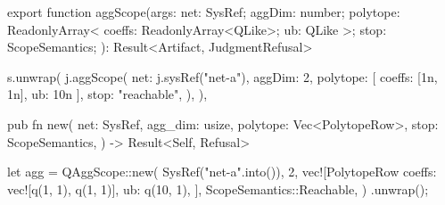 \begin{tssrc}
export function aggScope(args: {
  net: SysRef;
  aggDim: number;
  polytope: ReadonlyArray<{ coeffs: ReadonlyArray<QLike>; ub: QLike }>;
  stop: ScopeSemantics;
}): Result<Artifact, JudgmentRefusal>
\end{tssrc}
\begin{tssrc}
s.unwrap(
  j.aggScope({
    net: j.sysRef("net-a"),
    aggDim: 2,
    polytope: [{ coeffs: [1n, 1n], ub: 10n }],
    stop: "reachable",
  }),
),
\end{tssrc}
\begin{rustsrc}
pub fn new(
    net: SysRef,
    agg_dim: usize,
    polytope: Vec<PolytopeRow>,
    stop: ScopeSemantics,
) -> Result<Self, Refusal>
\end{rustsrc}
\begin{rustsrc}
let agg = QAggScope::new(
    SysRef("net-a".into()),
    2,
    vec![PolytopeRow {
        coeffs: vec![q(1, 1), q(1, 1)],
        ub: q(10, 1),
    }],
    ScopeSemantics::Reachable,
)
.unwrap();
\end{rustsrc}
